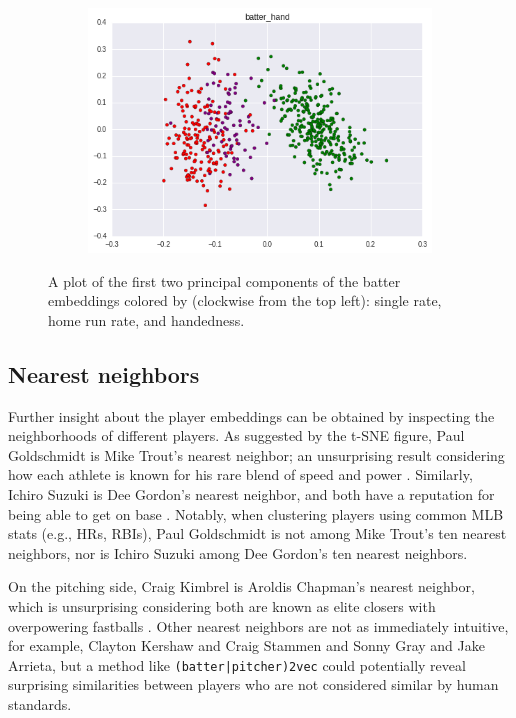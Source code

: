 \documentclass{article}
\begin{document}
\begin{figure}
    \begin{subfigure}{0.5\linewidth}
    \centering
    \includegraphics[width=1\linewidth]{batter_hand.png}
    \caption{}
    \end{subfigure}
\caption{A plot of the first two principal components of the batter embeddings colored by (clockwise from the top left): single rate, home run rate, and handedness.}
\label{fig:batter_traits}
\end{figure}

\subsection{Nearest neighbors}

Further insight about the player embeddings can be obtained by inspecting the neighborhoods of different players. As suggested by the t-SNE figure, Paul Goldschmidt is Mike Trout's nearest neighbor; an unsurprising result considering how each athlete is known for his rare blend of speed and power \parencite{Kory2015}. Similarly, Ichiro Suzuki is Dee Gordon's nearest neighbor, and both have a reputation for being able to get on base \parencite{Sullivan2015}. Notably, when clustering players using common MLB stats (e.g., HRs, RBIs), Paul Goldschmidt is not among Mike Trout's ten nearest neighbors, nor is Ichiro Suzuki among Dee Gordon's ten nearest neighbors.

On the pitching side, Craig Kimbrel is Aroldis Chapman's nearest neighbor, which is unsurprising considering both are known as elite closers with overpowering fastballs \parencite{Mirsky2016}. Other nearest neighbors are not as immediately intuitive, for example, Clayton Kershaw and Craig Stammen and Sonny Gray and Jake Arrieta, but a method like \texttt{(batter|pitcher)2vec} could potentially reveal surprising similarities between players who are not considered similar by human standards.
\end{document}
